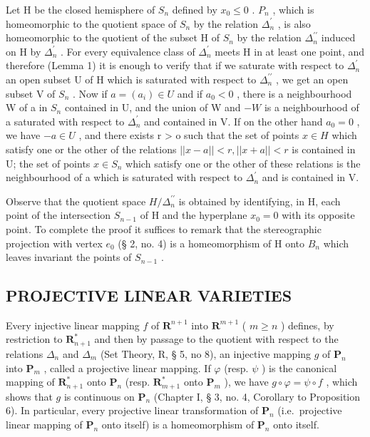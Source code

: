 Let H be the closed hemisphere of \(S_{n}\) defined by \(x_{0} \leqslant 0\) . \(P_{n}\) , which is homeomorphic to the quotient space of \(S_{n}\) by the relation \(\Delta_{n}^{\prime}\) , is also homeomorphic to the quotient of the subset H of \(S_{n}\) by the relation \(\Delta_{n}^{\prime\prime}\) induced on H by \(\Delta_{n}^{\prime}\) . For every equivalence class of \(\Delta_{n}^{\prime}\) meets H in at least one point, and therefore (Lemma 1) it is enough to verify that if we saturate with respect to \(\Delta_{n}^{\prime}\) an open subset U of H which is saturated with respect to \(\Delta_{n}^{\prime\prime}\) , we get an open subset V of \(S_{n}\) . Now if \(a = (a_{i}) \in U\) and if \(a_{0} < 0\) , there is a neighbourhood W of a in \(S_{n}\) contained in U, and the union of W and \(-W\) is a neighbourhood of a saturated with respect to \(\Delta_{n}^{\prime}\) and contained in V. If on the other hand \(a_{0} = 0\) , we have \(- a \in U\) , and there exists r \textgreater{} o such that the set of points \(x \in H\) which satisfy one or the other of the relations \(||x-a||<r, ||x+a||<r\) is contained in U; the set of points \(x\in S_{n}\) which satisfy one or the other of these relations is the neighbourhood of a which is saturated with respect to \(\Delta_{n}^{\prime}\) and is contained in V.

Observe that the quotient space \(H/\Delta_{n}^{\prime\prime}\) is obtained by identifying, in H, each point of the intersection \(S_{n-1}\) of H and the hyperplane \(x_{0}=0\) with its opposite point. To complete the proof it suffices to remark that the stereographic projection with vertex \(e_{0}\) (§ 2, no. 4) is a homeomorphism of H onto \(B_{n}\) which leaves invariant the points of \(S_{n-1}\) .

\subsection{PROJECTIVE LINEAR VARIETIES}

Every injective linear mapping \(f\) of \(\mathbf{R}^{n+1}\) into \(\mathbf{R}^{m+1}\) ( \(m \geqslant n\) ) defines, by restriction to \(\mathbf{R}_{n+1}^*\) and then by passage to the quotient with respect to the relations \(\Delta_n\) and \(\Delta_m\) (Set Theory, R, § 5, no 8), an injective mapping \(g\) of \(\mathbf{P}_n\) into \(\mathbf{P}_m\) , called a projective linear mapping. If \(\varphi\) (resp. \(\psi\) ) is the canonical mapping of \(\mathbf{R}_{n+1}^*\) onto \(\mathbf{P}_n\) (resp. \(\mathbf{R}_{m+1}^*\) onto \(\mathbf{P}_m\) ), we have \(g \circ \varphi = \psi \circ f\) , which shows that \(g\) is continuous on \(\mathbf{P}_n\) (Chapter I, § 3, no. 4, Corollary to Proposition 6). In particular, every projective linear transformation of \(\mathbf{P}_n\) (i.e.~projective linear mapping of \(\mathbf{P}_n\) onto itself) is a homeomorphism of \(\mathbf{P}_n\) onto itself.

